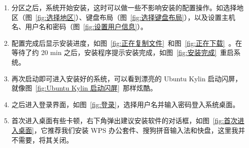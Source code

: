 \documentclass[cs4size,a4paper,nofonts]{ctexart}
\begin{document}
\begin{enumerate}
\begin{figure}[htp]
\end{figure}

\begin{figure}[htp]
\end{figure}

\item 分区之后，系统开始安装，这时可以做一些不影响安装的配置操作。如选择地区（图~\ref{fig:选择地区}）、键盘布局（图~\ref{fig:选择键盘布局}），以及设置主机名、用户名和密码（图~\ref{fig:设置用户信息}）。

\begin{figure}[htp]
\end{figure}

\begin{figure}[htp]
\end{figure}

\item 配置完成后显示安装进度，如图~\ref{fig:正在复制文件}~和图~\ref{fig:正在下载}~。在等待了约 20 min 之后，安装程序提示安装完成，如图~\ref{fig:安装完成}~重启系统。

\begin{figure}[htp]
\end{figure}

\item 再次启动即可进入安装好的系统，可以看到漂亮的 Ubuntu Kylin 启动闪屏，就像图~\ref{fig:Ubuntu Kylin 启动闪屏}~那样炫酷。

\item 之后进入登录界面，如图~\ref{fig:登录}，选择用户名并输入密码登入系统桌面。

\begin{figure}[htp]
\end{figure}

\item 首次进入桌面有些卡顿，右下角弹出建议安装软件的对话框，如图~\ref{fig:首次进入桌面}，它推荐我们安装 WPS 办公套件、搜狗拼音输入法和快盘，这里我并不需要，将其关闭。


\end{enumerate}
\end{document}
